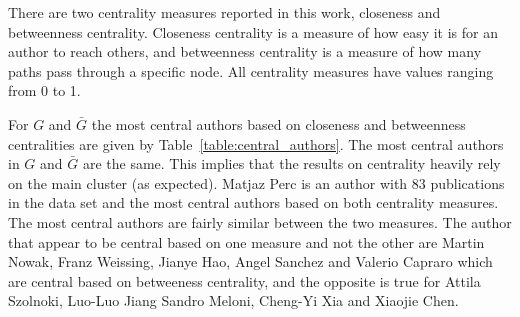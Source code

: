\documentclass{article}
\theoremstyle{definition}
\begin{document}
\begin{table}[H]
    \centering
    \caption{Network metrics for topic networks.}\label{table:topics_networks}
\end{table}

There are two centrality measures reported in this work, closeness and
betweenness centrality. Closeness centrality is a measure of how easy it is for
an author to reach others, and betweenness centrality is a
measure of how many paths pass through a specific node. All centrality measures 
have values ranging from 0 to 1.

For \(G\) and \(\bar{G}\) the most central authors based on closeness and
betweenness centralities are given by Table~\ref{table:central_authors}. The
most central authors in \(G\) and \(\bar{G}\) are the same. This implies that
the results on centrality heavily rely on the main cluster (as expected). Matjaz Perc is an
author with 83 publications in the data set and the most central authors based
on both centrality measures. The most central authors are fairly similar between
the two measures. The author that appear to be central based on one measure and
not the other are Martin Nowak, Franz Weissing, Jianye Hao, Angel Sanchez and
Valerio Capraro which are central based on betweeness centrality, and 
the opposite is true for Attila Szolnoki, Luo-Luo Jiang Sandro Meloni, Cheng-Yi
Xia and Xiaojie Chen.
\end{document}
